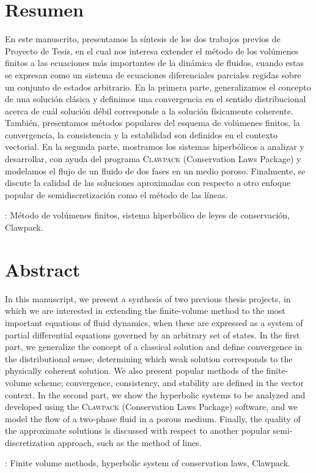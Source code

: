 \chapter*{Resumen}

En este manuscrito, presentamos la síntesis de los dos trabajos
previos de Proyecto de Tesis, en el cual nos interesa extender el
método de los volúmenes finitos a las ecuaciones más importantes de la
dinámica de fluidos, cuando estas se expresan como un sistema de
ecuaciones diferenciales parciales regidas sobre un conjunto de
estados arbitrario.
En la primera parte, generalizamos el concepto de una solución
clásica y definimos una convergencia en el sentido distribucional
acerca de cuál solución débil corresponde a la solución físicamente
coherente.
También, presentamos métodos populares del esquema de volúmenes
finitos, la convergencia, la consistencia y la estabilidad son
definidos en el contexto vectorial.
En la segunda parte, mostramos los sistemas hiperbólicos a analizar
y desarrollar, con ayuda del programa \textsc{Clawpack} (Conservation
Laws Package) y modelamos el flujo de un fluido de dos fases en un medio
poroso.
Finalmente, se discute la calidad de las soluciones aproximadas con
respecto a otro enfoque popular de semidiscretización como el método
de las líneas.

: Método de volúmenes
finitos, sistema hiperbólico de leyes de conservación, Clawpack.

\chapter*{Abstract}

In this manuscript, we present a synthesis of two previous thesis
projects, in which we are interested in extending the finite-volume
method to the most important equations of fluid dynamics, when these
are expressed as a system of partial differential equations governed
by an arbitrary set of states.
In the first part, we generalize the concept of a classical solution
and define convergence in the distributional sense, determining which
weak solution corresponds to the physically coherent solution.
We also present popular methods of the finite-volume scheme;
convergence, consistency, and stability are defined in the vector
context.
In the second part, we show the hyperbolic systems to be analyzed and
developed using the \textsc{Clawpack} (Conservation Laws Package)
software,
and we model the flow of a two-phase fluid in a porous medium.
Finally, the quality of the approximate solutions is discussed with
respect to another popular semi-discretization approach, such as the
method of lines.

: Finite volume methods,
hyperbolic system of conservation laws, Clawpack.
